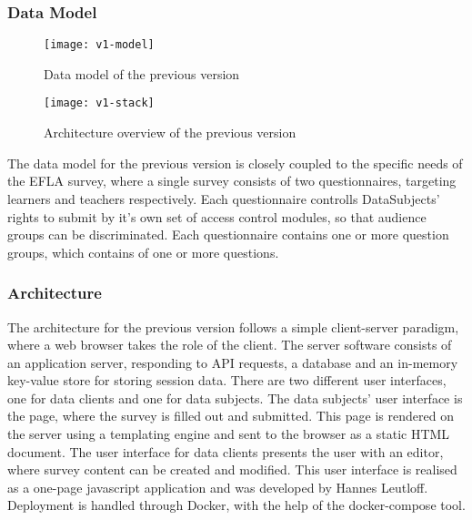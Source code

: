    \subsubsection{Data Model}

   \begin{figure}[H]
        \centering
        \texttt{[image: v1-model]}
        \caption{Data model of the previous version}
        \label{fig:v1-data-model}
    \end{figure}

    \begin{wrapfigure}{o}{.5\textwidth}
        \centering
        \texttt{[image: v1-stack]}
        \caption{Architecture overview of the previous version}
        \label{fig:v1-stack}
    \end{wrapfigure}

    The data model for the previous version is closely coupled to the specific needs of the
    EFLA survey, where a single survey consists of two questionnaires, targeting
    learners and teachers respectively.
    Each questionnaire controlls DataSubjects' rights to submit by it's own set of access 
    control modules, so that audience groups can be discriminated.
    Each questionnaire contains one or more question groups, which contains of
    one or more questions.

    \subsubsection{Architecture}

    The architecture for the previous version follows a simple client-server paradigm, where
    a web browser takes the role of the client. The server software consists of an
    application server, responding to API requests, a database and an in-memory
    key-value store for storing session data. There are two different user interfaces,
    one for data clients and one for data subjects. The data subjects' user interface
    is the page, where the survey is filled out and submitted. This page is rendered
    on the server using a templating engine and sent to the browser as a static HTML document.
    The user interface for data clients presents the user with an editor, where survey content
    can be created and modified. This user interface is realised as a one-page
    javascript application and was developed by Hannes Leutloff. Deployment is handled through
    Docker, with the help of the docker-compose tool.

